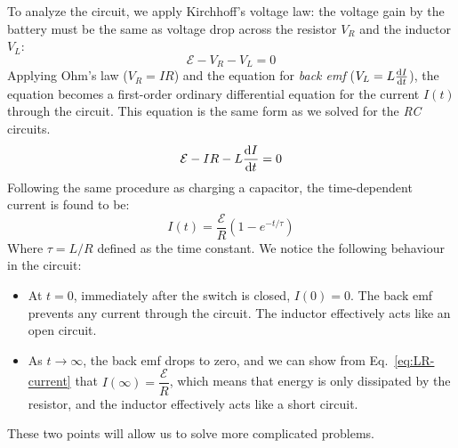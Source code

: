 To analyze the circuit, we apply Kirchhoff's voltage law: the voltage gain by
the battery must be the same as voltage drop across the resistor $V_R$ and the
inductor $V_L$:
\begin{equation}
  \mathcal E-V_R-V_L=0
\end{equation}
Applying Ohm's law ($V_R=IR$) and the equation for \emph{back emf}
($V_L=L\diff It$), the equation becomes a first-order ordinary differential
equation for the current $I(t)$ through the circuit. This equation is the same
form as we solved for the \emph{RC} circuits.
\begin{equation}
  \mathcal E-IR-L\diff It=0
\end{equation}
Following the same procedure as charging a capacitor, the time-dependent
current is found to be:
\begin{equation}
  I(t)=\frac{\mathcal E}R\left(1-e^{-t/\tau}\right)
  \label{eq:LR-current}
\end{equation}
Where $\tau=L/R$ defined as the time constant. We notice the following
behaviour in the circuit:
\begin{itemize}
\item At $t=0$, immediately after the switch is closed, $I(0)=0$. The back emf
  prevents any current through the circuit. The inductor effectively acts like
  an open circuit.
\item As $t\rightarrow\infty$, the back emf drops to zero, and we can show
  from Eq.~\ref{eq:LR-current} that $I(\infty)=\dfrac{\mathcal E}R$, which
  means that energy is only dissipated by the resistor, and the inductor
  effectively acts like a short circuit.
\end{itemize}
These two points will allow us to solve more complicated problems.



